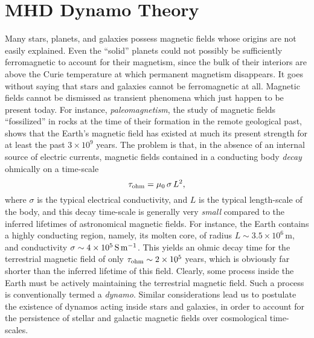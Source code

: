 \section{MHD Dynamo Theory}
Many stars, planets, and galaxies possess magnetic fields whose origins
are not easily explained. Even the ``solid'' planets could not possibly
be sufficiently ferromagnetic to account for their magnetism, since the bulk
of their interiors are above the Curie temperature at which permanent magnetism 
disappears. It goes without saying that stars and galaxies cannot
be ferromagnetic at all. Magnetic fields cannot be dismissed as transient
phenomena which just happen to be present today. For instance, 
{\em paleomagnetism}, the study of magnetic fields ``fossilized'' in rocks
at the time of their formation in the remote geological past, shows
that the Earth's magnetic field has existed at much its present
strength for at least the past $3\times 10^9$ years. The problem is that,
in the absence of an internal  source of electric currents, magnetic fields contained in a
conducting body {\em decay}\/ ohmically on a time-scale
\begin{equation}
\tau_{\rm ohm} = \mu_0\,\sigma\,L^2,
\end{equation}
where $\sigma$ is the typical electrical conductivity, and $L$ is the
typical length-scale of the body, and  this decay time-scale is generally
very {\em small}\/  compared to the inferred  lifetimes of astronomical magnetic fields. For instance,
the Earth contains a highly conducting region, namely, its molten core, of
radius $L\sim 3.5\times 10^6$\,m, and conductivity $\sigma\sim 4\times 10^5\,
{\rm S}\,{\rm m}^{-1}$. This yields an ohmic decay time for the terrestrial
magnetic field of only $\tau_{\rm ohm}\sim 2\times 10^5$ years, which is
obviously far shorter than the inferred lifetime of this field.
Clearly, some process inside the Earth must be actively maintaining the
terrestrial magnetic field. Such a process is conventionally termed a
{\em dynamo}. Similar considerations lead us to postulate the existence
of 
dynamos acting inside stars and galaxies, in order to account for the persistence
of stellar and galactic magnetic fields over cosmological time-scales. 

